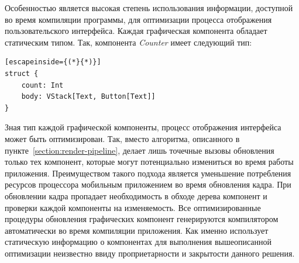 Особенностью  является высокая степень использования
информации, доступной во время компиляции программы, для оптимизации
процесса отображения пользовательского интерфейса. Каждая графическая
компонента обладает статическим типом. Так, компонента \textit{Counter}
имеет следующий тип:
\begin{lstlisting}[escapeinside={(*}{*)}]
struct {
    count: Int
    body: VStack[Text, Button[Text]]
}
\end{lstlisting}
Зная тип каждой графической компоненты, процесс отображения интерфейса
может быть оптимизирован. Так, вместо алгоритма, описанного в
пункте~\ref{section:render-pipeline},  делает лишь точечные
вызовы обновления только тех компонент, которые могут потенциально
измениться во время работы приложения. Преимуществом такого подхода является
уменьшение потребления ресурсов процессора мобильным приложением во время
обновления кадра. При обновлении кадра пропадает необходимость в обходе
дерева компонент и проверки каждой компоненты на изменяемость.
Все оптимизированные процедуры обновления графических компонент генерируются
компилятором автоматически во время компиляции приложения. Как именно
 использует статическую информацию о компонентах для
выполнения вышеописанной оптимизации неизвестно ввиду проприетарности и
закрытости данного решения.

